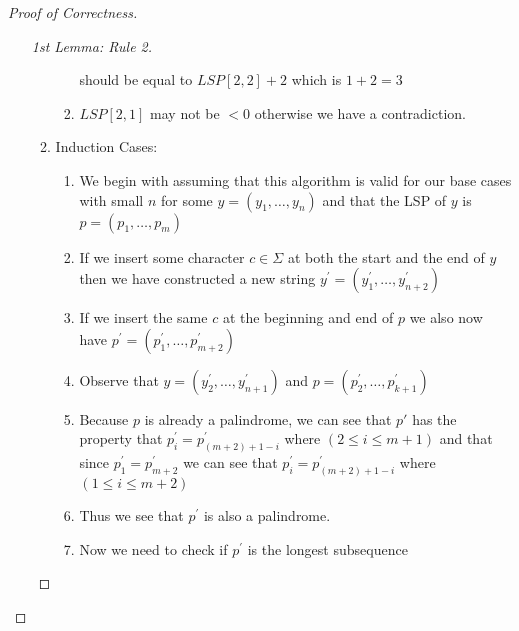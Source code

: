 \documentclass{article}
\begin{document}
\begin{proof}[Proof of Correctness]
\begin{enumerate}
\begin{proof}[1st Lemma: Rule 2]
\begin{enumerate}
\begin{enumerate}
                                                should be equal to \(LSP[2,2] + 2\) which is \(1+2=3\)
                                          \item \(LSP[2,1]\) may not be \(<0\)  otherwise we have a contradiction.
                                    \end{enumerate}
                              \item Induction Cases: \begin{enumerate}
                                          \item We begin with assuming that this algorithm
                                                is valid for our base cases with small \(n\)
                                                for some \(y = (y_1,\dots,y_n)\)  and that the LSP of
                                                \(y\) is \(p = (p_1,\dots,p_m)\)
                                          \item If we insert some character \(c \in \Sigma
                                                \) at both the start
                                                and the end of \(y\)
                                                then we have constructed a new string \(y^{\prime} = (y^{\prime}_1,\dots,y^{\prime}_{n+2})\)
                                          \item If we insert the same \(c\) at the beginning and end of \(p\) we also now have
                                                \(p^{\prime} = (p^{\prime}_1,\dots,p^{\prime}_{m+2})\)
                                          \item Observe that \(y = (y^{\prime}_2,\dots,y^{\prime}_{n+1})\) and \(p = (p^{\prime}_2,\dots,p^{\prime}_{k+1})\)
                                          \item Because \(p\) is already a palindrome, we can see that \(p'\) has the property
                                                that \(p^{\prime}_i = p^{\prime}_{(m+2)+1-i}\) where \((2 \leq i \leq m+1)\)  and that since
                                                \(p^{\prime}_1 = p^{\prime}_{m+2}\) we can see that \(p^{\prime}_i =p^{\prime}_{(m+2)+1-i}\) where
                                                \((1 \leq i \leq m+2)\)
                                          \item Thus we see that \(p^{\prime}\) is also a palindrome.
                                          \item Now we need to check if \(p^{\prime}\) is the longest subsequence

\end{enumerate}
\end{enumerate}
\end{proof}
\end{enumerate}
\end{proof}
\end{document}
